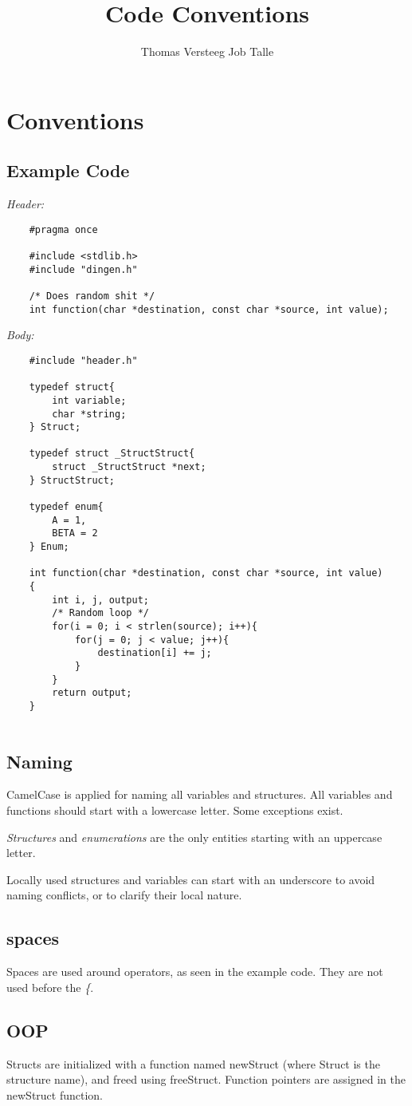 \documentclass[a4paper]{article}
\begin{document}
\title{Code Conventions}
\author{Thomas Versteeg \quad Job Talle}

\maketitle

\section{Conventions}
\subsection{Example Code}
\emph{Header:}
\begin{lstlisting}
    #pragma once
     
    #include <stdlib.h>
    #include "dingen.h"
     
    /* Does random shit */
    int function(char *destination, const char *source, int value);
\end{lstlisting}
\emph{Body:}
\begin{lstlisting}
    #include "header.h"
     
    typedef struct{
        int variable;
        char *string;
    } Struct;
     
    typedef struct _StructStruct{
        struct _StructStruct *next;
    } StructStruct;
     
    typedef enum{
        A = 1,
        BETA = 2
    } Enum;
     
    int function(char *destination, const char *source, int value)
    {
        int i, j, output;
        /* Random loop */
        for(i = 0; i < strlen(source); i++){
            for(j = 0; j < value; j++){
                destination[i] += j;
            }
        }  
        return output;
    }


\end{lstlisting}

\subsection{Naming}
CamelCase is applied for naming all variables and structures. All variables and functions should start with a lowercase letter. Some exceptions exist.

\emph{Structures} and \emph{enumerations} are the only entities starting with an uppercase letter.

Locally used structures and variables can start with an underscore to avoid naming conflicts, or to clarify their local nature.

\subsection{spaces}
Spaces are used around operators, as seen in the example code. They are not used before the \emph{\{}.

\subsection{OOP}
Structs are initialized with a function named newStruct (where Struct is the structure name), and freed using freeStruct. Function pointers are assigned in the newStruct function.
\end{document}
